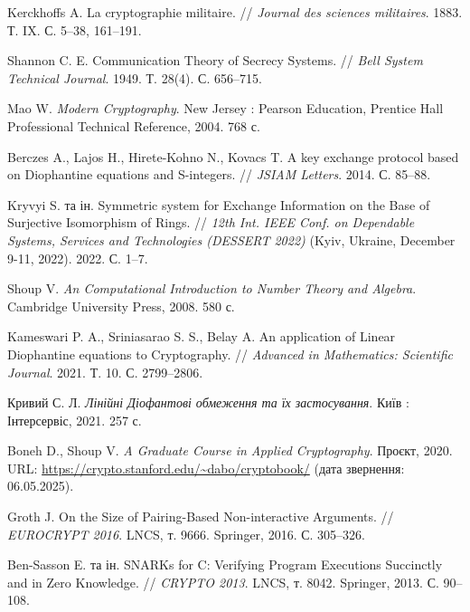\clearpage
{}
{}

\begin{thebibliography}{XX}

    Kerckhoffs A. La cryptographie militaire. // \textit{Journal des sciences militaires}. 1883. Т. IX. С. 5--38, 161--191.

    Shannon C. E. Communication Theory of Secrecy Systems. // \textit{Bell System Technical Journal}. 1949. Т. 28(4). С. 656--715.

    Mao W. \textit{Modern Cryptography}. New Jersey : Pearson Education, Prentice Hall Professional Technical Reference, 2004. 768 с.

    Berczes A., Lajos H., Hirete-Kohno N., Kovacs T. A key exchange protocol based on Diophantine equations and S-integers. // \textit{JSIAM Letters}. 2014. С. 85--88.

    Kryvyi S. та ін. Symmetric system for Exchange Information on the Base of Surjective Isomorphism of Rings. // \textit{12th Int. IEEE Conf. on Dependable Systems, Services and Technologies (DESSERT 2022)} (Kyiv, Ukraine, December 9-11, 2022). 2022. С. 1--7.

    Shoup V. \textit{An Computational Introduction to Number Theory and Algebra}. Cambridge University Press, 2008. 580 с.

    Kameswari P. A., Sriniasarao S. S., Belay A. An application of Linear Diophantine equations to Cryptography. // \textit{Advanced in Mathematics: Scientific Journal}. 2021. Т. 10. С. 2799--2806.

    Кривий С. Л. \textit{Лінійні Діофантові обмеження та їх застосування}. Київ : Інтерсервіс, 2021. 257 с.

    Boneh D., Shoup V. \textit{A Graduate Course in Applied Cryptography}. Проєкт, 2020. URL: \url{https://crypto.stanford.edu/~dabo/cryptobook/} (дата звернення: 06.05.2025).

    Groth J. On the Size of Pairing-Based Non-interactive Arguments. // \textit{EUROCRYPT 2016}. LNCS, т. 9666. Springer, 2016. С. 305--326.

    Ben-Sasson E. та ін. SNARKs for C: Verifying Program Executions Succinctly and in Zero Knowledge. // \textit{CRYPTO 2013}. LNCS, т. 8042. Springer, 2013. С. 90--108.


\end{thebibliography}

